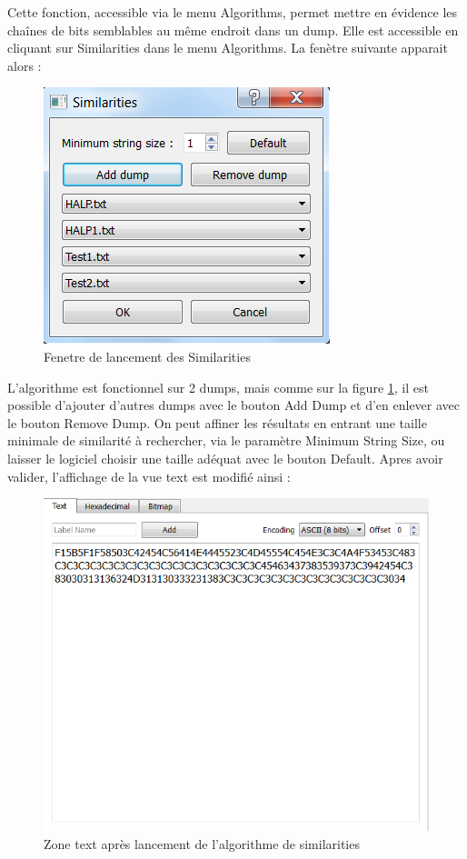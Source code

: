 Cette fonction, accessible via le menu Algorithms, permet mettre en évidence les chaînes de bits semblables au même endroit dans un dump.
Elle est accessible en cliquant sur Similarities dans le menu Algorithms. La fenètre suivante apparait alors :

\begin{figure}[!h]
  \begin{center}
  \includegraphics[scale=1]{similaritiesdialog.png}
  \caption{Fenetre de lancement des Similarities}
  \label{similaritiesdialog}
  \end{center}
\end{figure}

L'algorithme est fonctionnel sur 2 dumps, mais comme sur la figure \ref{similaritiesdialog}, il est possible d'ajouter d'autres dumps avec le bouton Add Dump et d'en enlever avec le bouton Remove Dump.
On peut affiner les résultats en entrant une taille minimale de similarité à rechercher, via le paramètre Minimum String Size, ou laisser le logiciel choisir une taille adéquat avec le bouton Default.
Apres avoir valider, l'affichage de la vue text est modifié ainsi :

\begin{figure}[!h]
  \begin{center}
  \includegraphics[scale=1]{similaritiescolor.png}
  \caption{Zone text après lancement de l'algorithme de similarities}
  \label{similaritiescolor}
  \end{center}
\end{figure}

